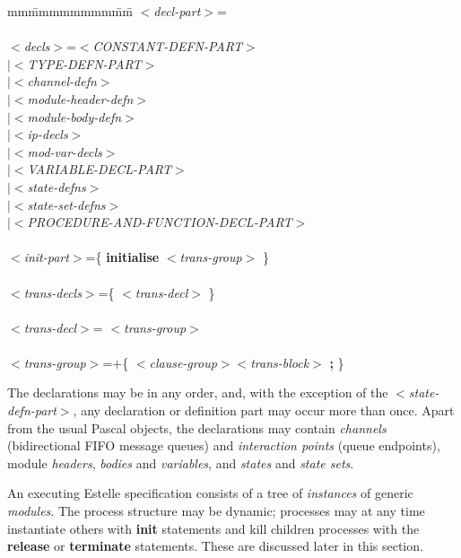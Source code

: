 \begin{tabbing}
mm\=mmmmmmmm\=mm\=\+\kill
$<${\em decl-part}$>$\>=\\
\mbox{}\\
$<${\em decls}$>$\>=\>$<${\em CONSTANT-DEFN-PART}$>$\\
\>\>$|<${\em TYPE-DEFN-PART}$>$\\
\>\>$|<${\em channel-defn}$>$\\
\>\>$|<${\em module-header-defn}$>$\\
\>\>$|<${\em module-body-defn}$>$\\
\>\>$|<${\em ip-decls}$>$\\
\>\>$|<${\em mod-var-decls}$>$\\
\>\>$|<${\em VARIABLE-DECL-PART}$>$\\
\>\>$|<${\em state-defns}$>$\\
\>\>$|<${\em state-set-defns}$>$\\
\>\>$|<${\em PROCEDURE-AND-FUNCTION-DECL-PART}$>$\\
\mbox{}\\
$<${\em init-part}$>$\>=\>\{ {\bf initialise} $<${\em trans-group}$>$ \}\\
\mbox{}\\
$<${\em trans-decls}$>$\>=\>\{ $<${\em trans-decl}$>$ \}\\
\mbox{}\\
$<${\em trans-decl}$>$\>= $<${\em trans-group}$>$\\
\mbox{}\\
$<${\em trans-group}$>$\>=\>+\{ $<${\em clause-group}$><${\em trans-block}$>$
{\bf ;} \}\\
\end{tabbing}

The declarations may be in any order, and, with the
exception of the $<${\em state-defn-part}$>$, any declaration or
definition part may occur more than once. Apart from the
usual Pascal objects, the declarations may contain {\em channels}
(bidirectional FIFO message queues) and {\em interaction points}
(queue endpoints), module {\em headers}, {\em bodies} and {\em
variables}, and {\em states} and {\em state sets}.

An executing Estelle specification consists of
a tree of {\em instances} of generic {\em modules}. The
process structure may be dynamic; processes may at any time
instantiate others with {\bf init} statements and kill children
processes with the {\bf release} or {\bf terminate} statements. These
are discussed later in this section.

